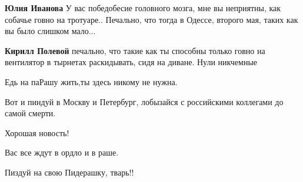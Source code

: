 \begin{itemize}
\begin{itemize}
\textbf{Юлия Иванова} У вас победобесие головного мозга, мне вы неприятны, как собачье говно на тротуаре.. Печально, что тогда в Одессе, второго мая, таких как вы было слишком мало...

 
\textbf{Кирилл Полевой} печально, что такие как ты способны только говно на вентилятор в тырнетах раскидывать, сидя на диване. Нули никчемные
\end{itemize}

 
Едь на паРашу жить,ты здесь никому не нужна.

 
Вот и пиндуй в Москву и Петербург, лобызайся с российскими коллегами до самой смерти.

 
Хорошая новость!

 
Вас все ждут в ордло и в раше.

 
Пиздуй на свою Пидерашку, тварь!!

 

\end{itemize}
